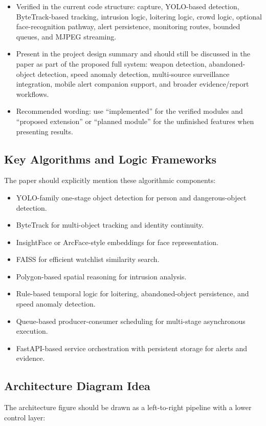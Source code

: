 \documentclass[11pt]{article}
\begin{document}
\begin{itemize}
\item Verified in the current code structure: capture, YOLO-based detection, ByteTrack-based tracking, intrusion logic, loitering logic, crowd logic, optional face-recognition pathway, alert persistence, monitoring routes, bounded queues, and MJPEG streaming.
\item Present in the project design summary and should still be discussed in the paper as part of the proposed full system: weapon detection, abandoned-object detection, speed anomaly detection, multi-source surveillance integration, mobile alert companion support, and broader evidence/report workflows.
\item Recommended wording: use ``implemented'' for the verified modules and ``proposed extension'' or ``planned module'' for the unfinished features when presenting results.
\end{itemize}

\subsection{Key Algorithms and Logic Frameworks}
The paper should explicitly mention these algorithmic components:

\begin{itemize}
\item YOLO-family one-stage object detection for person and dangerous-object detection.
\item ByteTrack for multi-object tracking and identity continuity.
\item InsightFace or ArcFace-style embeddings for face representation.
\item FAISS for efficient watchlist similarity search.
\item Polygon-based spatial reasoning for intrusion analysis.
\item Rule-based temporal logic for loitering, abandoned-object persistence, and speed anomaly detection.
\item Queue-based producer-consumer scheduling for multi-stage asynchronous execution.
\item FastAPI-based service orchestration with persistent storage for alerts and evidence.
\end{itemize}

\subsection{Architecture Diagram Idea}
The architecture figure should be drawn as a left-to-right pipeline with a lower control layer:
\end{document}
